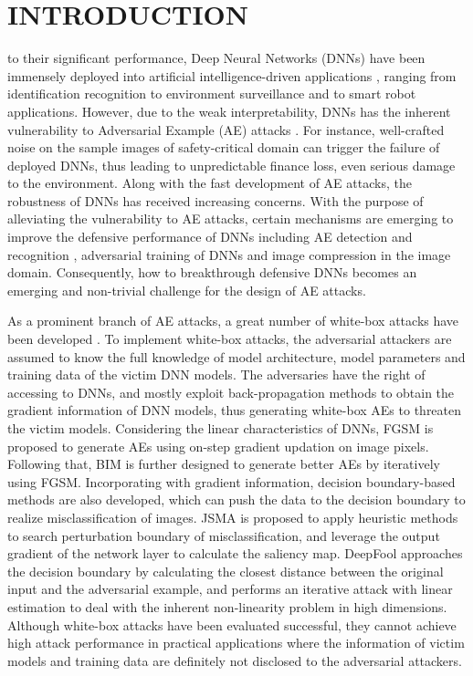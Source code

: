 \documentclass[lettersize,journal]{IEEEtran}
\begin{document}
\section{INTRODUCTION}
 to their significant performance, Deep Neural Networks (DNNs) have been immensely deployed into artificial intelligence-driven applications \cite{huang2017densely}\cite{10.1145/3470493}, ranging from identification recognition to environment surveillance and to smart robot applications. However, due to the weak interpretability, DNNs has the inherent vulnerability to Adversarial Example (AE) attacks  \cite{DBLP:journals/tec/ChenWXYPCD21}. For instance, well-crafted noise on the sample images of  safety-critical domain \cite{DBLP:conf/cvpr/KongGLL20} can trigger the failure of deployed DNNs, thus leading to unpredictable finance loss, even serious damage to the environment.  Along with the fast development of AE attacks, the robustness of DNNs has received increasing concerns. With the purpose of alleviating the vulnerability to AE attacks, certain mechanisms are emerging to improve the defensive performance of DNNs including AE detection and recognition \cite{2019Detecting}, adversarial training of DNNs \cite{2017Towards} and image compression \cite{2020ComDefend} in the image domain. Consequently, how to breakthrough defensive DNNs becomes an emerging and non-trivial challenge for the design of AE attacks.

As a prominent branch of AE attacks, a great number of white-box attacks have been developed \cite{rony2019decoupling}\cite{selvaraju2017grad}. To implement white-box attacks, the adversarial attackers are assumed to know the full knowledge of model architecture, model parameters and training data of the victim DNN models. The adversaries have the right of accessing to DNNs, and mostly exploit back-propagation methods to obtain the gradient information of DNN models, thus generating white-box AEs to threaten the victim models. Considering the linear characteristics of DNNs, FGSM \cite{DBLP:journals/corr/GoodfellowSS14} is proposed to generate AEs using on-step gradient updation on image pixels. Following that, BIM \cite{DBLP:journals/mlc/RenHY21} \cite{9239350} is further designed to generate better AEs by iteratively using FGSM. Incorporating with gradient information, decision boundary-based methods are also developed, which can push the data to the decision boundary to realize misclassification of images. JSMA is proposed to apply heuristic methods to search perturbation boundary of misclassification, and leverage the output gradient of the network layer to calculate the saliency map. DeepFool \cite{moosavi2016deepfool} approaches the decision boundary by calculating the closest distance between the original input and the adversarial example, and performs an iterative attack with linear estimation to deal with the inherent non-linearity problem in high dimensions. Although white-box attacks have been evaluated successful, they cannot achieve high attack performance in practical applications where the information of victim models and training data are definitely not disclosed to the adversarial attackers. 
\end{document}
